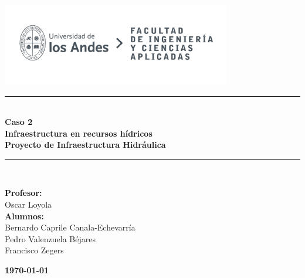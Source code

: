\documentclass{article} %
\begin{document}
\begin{titlepage}%
\newcommand{\HRule}{\rule{\linewidth}{0.5mm}} 
\center 
\includegraphics[width=10cm]{LOGO_UNIVERSIDAD.jpg}\\ %
\vspace{3cm}
\HRule \\[0.4cm]
{ \huge \bfseries Caso 2}\\[0.4cm]
{ \huge \bfseries Infraestructura en recursos hídricos}\\[0.4cm] %
{ \huge \bfseries Proyecto de Infraestructura Hidráulica}\\[0.4cm] %
\HRule \\[1.5cm]
 \vspace{5cm}
\begin{flushright}
    { \textbf{Profesor:}\\
    Oscar Loyola\\
    \vspace{0.2cm}
    \textbf{Alumnos:}\\
    Bernardo Caprile Canala-Echevarría\\
    Pedro Valenzuela Béjares\\
    Francisco Zegers
    \vspace{0.2cm}

}
\end{flushright}
\vspace{1cm}
{\large \textbf{\today}}\\[2cm] %
\end{titlepage}
\end{document}
